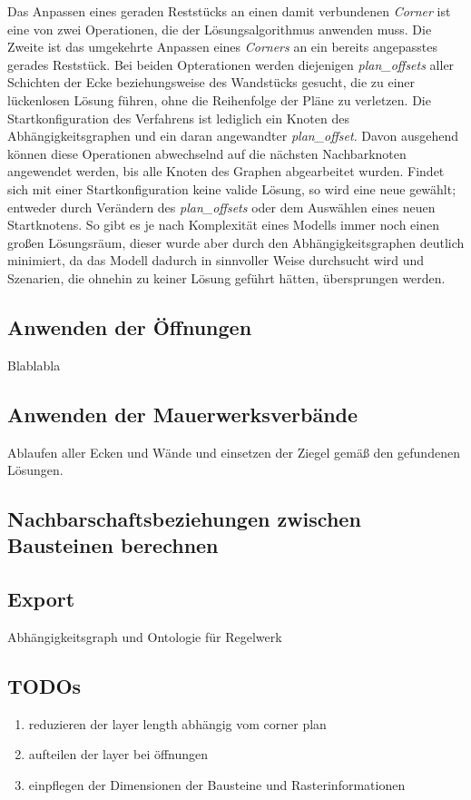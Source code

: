 Das Anpassen eines geraden Reststücks an einen damit verbundenen \textit{Corner} ist eine von zwei Operationen, die der Lösungsalgorithmus anwenden muss.
Die Zweite ist das umgekehrte Anpassen eines \textit{Corners} an ein bereits angepasstes gerades Reststück.
Bei beiden Opterationen werden diejenigen \textit{plan\_offsets} aller Schichten der Ecke beziehungsweise des Wandstücks gesucht, die zu einer lückenlosen Lösung führen, ohne die Reihenfolge der Pläne zu verletzen.
Die Startkonfiguration des Verfahrens ist lediglich ein Knoten des Abhängigkeitsgraphen und ein daran angewandter \textit{plan\_offset}.
Davon ausgehend können diese Operationen abwechselnd auf die nächsten Nachbarknoten angewendet werden, bis alle Knoten des Graphen abgearbeitet wurden.
Findet sich mit einer Startkonfiguration keine valide Lösung, so wird eine neue gewählt; entweder durch Verändern des \textit{plan\_offsets} oder dem Auswählen eines neuen Startknotens.
So gibt es je nach Komplexität eines Modells immer noch einen großen Lösungsräum, dieser wurde aber durch den Abhängigkeitsgraphen deutlich minimiert, da das Modell dadurch in sinnvoller Weise durchsucht wird und Szenarien, die ohnehin zu keiner Lösung geführt hätten, übersprungen werden.


\subsection{Anwenden der Öffnungen}
Blablabla

\subsection{Anwenden der Mauerwerksverbände}
Ablaufen aller Ecken und Wände und einsetzen der Ziegel gemäß den gefundenen Lösungen.

\subsection{Nachbarschaftsbeziehungen zwischen Bausteinen berechnen}

\subsection{Export}
Abhängigkeitsgraph und Ontologie für Regelwerk



\subsection*{TODOs}
\begin{enumerate}
  \item reduzieren der layer length abhängig vom corner plan
  \item aufteilen der layer bei öffnungen
  \item einpflegen der Dimensionen der Bausteine und Rasterinformationen
\end{enumerate}